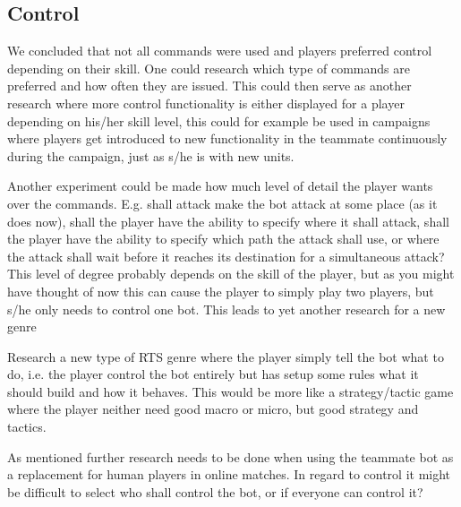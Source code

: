 \subsection{Control}
\label{sec:future_control}
We concluded that not all commands were used and players preferred control depending on their skill. One could research which type of commands are preferred and how often they are issued. This could then serve as another research where more control functionality is either displayed for a player depending on his/her skill level, this could for example be used in campaigns where players get introduced to new functionality in the teammate continuously during the campaign, just as s/he is with new units.

Another experiment could be made how much level of detail the player wants over the commands. E.g. shall attack make the bot attack at some place (as it does now), shall the player have the ability to specify where it shall attack, shall the player have the ability to specify which path the attack shall use, or where the attack shall wait before it reaches its destination for a simultaneous attack?
This level of degree probably depends on the skill of the player, but as you might have thought of now this can cause the player to simply play two players, but s/he only needs to control one bot. This leads to yet another research for a new genre

Research a new type of RTS genre where the player simply tell the bot what to do, i.e. the player control the bot entirely but has setup some rules what it should build and how it behaves. This would be more like a strategy/tactic game where the player neither need good macro or micro, but good strategy and tactics.

As mentioned further research needs to be done when using the teammate bot as a replacement for human players in online matches. In regard to control it might be difficult to select who shall control the bot, or if everyone can control it?